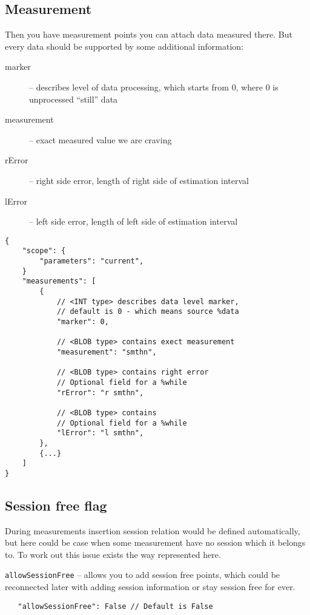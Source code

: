 \documentclass{article}
\begin{document}
    \subsection{Measurement}
    Then you have measurement points you can attach data measured there. But every data should be supported by some additional information:
    \begin{description}
        \item[marker] -- describes level of data processing, which starts from $0$, where $0$ is unprocessed ``still'' data
        \item[measurement] -- exact measured value we are craving
        \item[rError] -- right side error, length of right side of estimation interval
        \item[lError] -- left side error, length of left side of estimation interval
    \end{description}
\medskip
\begin{lstlisting}[caption=Measurement example]
{
    "scope": {
        "parameters": "current",
    }
    "measurements": [
        {
            // <INT type> describes data level marker, 
            // default is 0 - which means source %data
            "marker": 0, 

            // <BLOB type> contains exect measurement 
            "measurement": "smthn", 

            // <BLOB type> contains right error
            // Optional field for a %while            
            "rError": "r smthn", 

            // <BLOB type> contains
            // Optional field for a %while
            "lError": "l smthn", 
        },
        {...}
    ]
}
\end{lstlisting}

    \subsection{Session free flag}
    During measurements insertion session relation would be defined automatically, but here could be case when some measurement have no session which it belongs to. To work out this issue exists the way represented here.
    
\texttt{allowSessionFree} -- allows you to add session free points, which could be reconnected later with adding session information or stay session free for ever.

\begin{lstlisting}
   "allowSessionFree": False // Default is False
\end{lstlisting}
\end{document}

